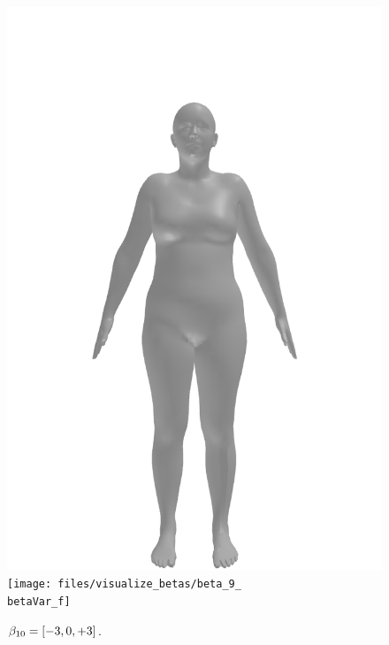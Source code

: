 \begin{figure}[ht!]
\begin{minipage}[b]{\textwidth}
        \includegraphics[width=\imgWidth]{files/visualize_betas/baseline_f}
        \texttt{[image: files/visualize\_betas/beta\_9\_\\betaVar\_f]}
        \caption[Effect of varying $\beta_{10}$ in SMPL.]{$\beta_{10} = [-3, 0, +3]$.}
        \label{fig:beta-10-vis}
    \end{minipage}
\end{figure}
